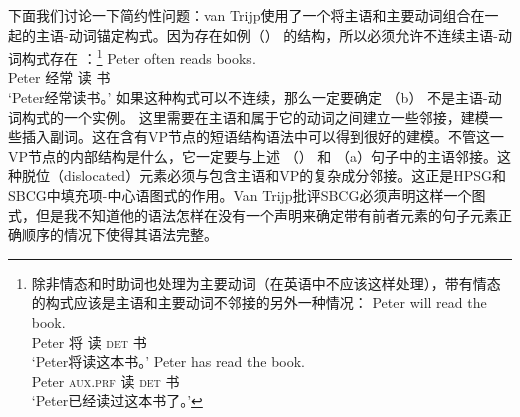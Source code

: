 下面我们讨论一下简约性问题：van Trijp使用了一个将主语和主要动词组合在一起的主语-动词锚定构式。因为存在如例（） 的结构，所以必须允许不连续主语-动词构式存在 ：\footnote{%
除非情态和时助词也处理为主要动词（在英语中不应该这样处理），带有情态的构式应该是主语和主要动词不邻接的另外一种情况：
  \eal
  \ex 
\gll Peter will read the book.\\
    Peter 将 读 \textsc{det} 书\\
\glt `Peter将读这本书。'
  \ex 
\gll Peter has read the book.\\
    Peter \textsc{aux}.\textsc{prf} 读 \textsc{det} 书\\
\glt `Peter已经读过这本书了。'
  \zllast
} 
\ea
\gll Peter often reads books.\\
     Peter 经常 读 书\\
\glt `Peter经常读书。'
\z
如果这种构式可以不连续，那么一定要确定 （b） 不是主语-动词构式的一个实例。
\eal
{}
\zl
这里需要在主语和属于它的动词之间建立一些邻接，建模一些插入副词。这在含有VP节点的短语结构语法中可以得到很好的建模。不管这一VP节点的内部结构是什么，它一定要与上述  （） 和 （a）句子中的主语邻接。这种脱位（dislocated）元素必须与包含主语和VP的复杂成分邻接。这正是HPSG和SBCG中填充项-中心语图式的作用。Van Trijp批评SBCG必须声明这样一个图式，但是我不知道他的语法怎样在没有一个声明来确定带有前者元素的句子元素正确顺序的情况下使得其语法完整。

